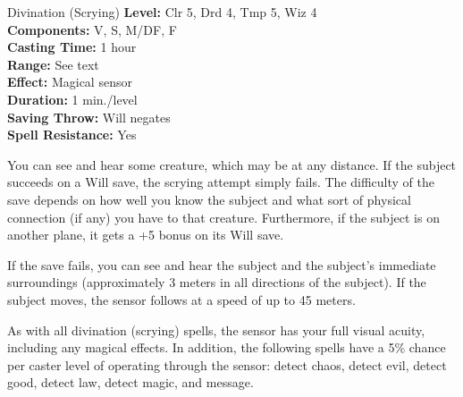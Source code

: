 {Divination (Scrying)}
{
	\textbf{Level:}
	Clr 5, Drd 4, Tmp 5, Wiz 4\\
	\textbf{Components:}
	V, S, M/DF, F\\
	\textbf{Casting Time:}
	1 hour\\
	\textbf{Range:}
	See text\\
	\textbf{Effect:}
	Magical sensor\\
	\textbf{Duration:}
	1 min./level\\
	\textbf{Saving Throw:}
	Will negates\\
	\textbf{Spell Resistance:}
	Yes\\
}
{
	You can see and hear some creature, which may be at any distance. If the subject succeeds on a Will save, the scrying attempt simply fails. The difficulty of the save depends on how well you know the subject and what sort of physical connection (if any) you have to that creature. Furthermore, if the subject is on another plane, it gets a +5 bonus on its Will save.



	If the save fails, you can see and hear the subject and the subject's immediate surroundings (approximately 3 meters in all directions of the subject). If the subject moves, the sensor follows at a speed of up to 45 meters.

	As with all divination (scrying) spells, the sensor has your full visual acuity, including any magical effects. In addition, the following spells have a 5\% chance per caster level of operating through the sensor: detect chaos, detect evil, detect good, detect law, detect magic, and message.

}
